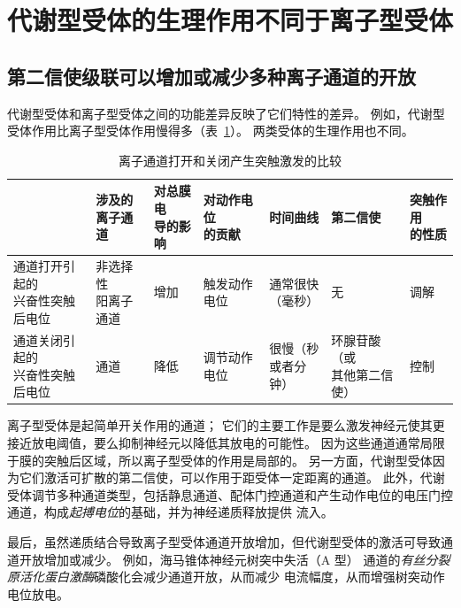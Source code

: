 \section{代谢型受体的生理作用不同于离子型受体}

\subsection{第二信使级联可以增加或减少多种离子通道的开放}

代谢型受体和离子型受体之间的功能差异反映了它们特性的差异。
例如，代谢型受体作用比离子型受体作用慢得多（表~\ref{tab:14_1}）。
两类受体的生理作用也不同。


\begin{table}[htbp]
	\caption{离子通道打开和关闭产生突触激发的比较} \label{tab:14_1} \centering
	\begin{tabular}{lllllll}
		\toprule
		 & \makecell[l]{涉及的\\离子通道} & \makecell[l]{对总膜电\\导的影响} & \makecell[l]{对动作电位\\的贡献} & 时间曲线 & 第二信使 & \makecell[l]{突触作用\\的性质} \\
		\midrule
		\makecell[l]{通道打开引起的\\兴奋性突触后电位} & \makecell[l]{非选择性\\阳离子通道} & 增加 & 触发动作电位 & \makecell[l]{通常很快\\（毫秒）} & 无 & 调解\\
		\midrule
		\makecell[l]{通道关闭引起的\\兴奋性突触后电位} & \ce{K+} 通道 & 降低 & 调节动作电位 & \makecell[l]{很慢（秒\\或者分钟）} & \makecell[l]{环腺苷酸（或\\其他第二信使）} & 控制 \\
		\bottomrule
	\end{tabular}
\end{table}


离子型受体是起简单开关作用的通道；
它们的主要工作是要么激发神经元使其更接近放电阈值，要么抑制神经元以降低其放电的可能性。
因为这些通道通常局限于膜的突触后区域，所以离子型受体的作用是局部的。
另一方面，代谢型受体因为它们激活可扩散的第二信使，可以作用于距受体一定距离的通道。
此外，代谢受体调节多种通道类型，包括静息通道、配体门控通道和产生动作电位的电压门控通道，构成\textit{起搏电位}的基础，并为神经递质释放提供  流入。


最后，虽然递质结合导致离子型受体通道开放增加，但代谢型受体的激活可导致通道开放增加或减少。
例如，海马锥体神经元树突中失活（A 型） 通道的\textit{有丝分裂原活化蛋白激酶}磷酸化会减少通道开放，从而减少  电流幅度，从而增强树突动作电位放电。



